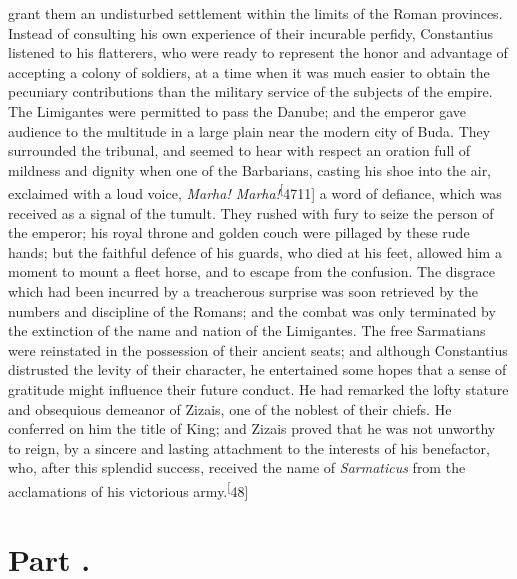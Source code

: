 grant them an undisturbed settlement within the limits of the
Roman provinces. Instead of consulting his own experience of
their incurable perfidy, Constantius listened to his flatterers,
who were ready to represent the honor and advantage of accepting
a colony of soldiers, at a time when it was much easier to obtain
the pecuniary contributions than the military service of the
subjects of the empire. The Limigantes were permitted to pass the
Danube; and the emperor gave audience to the multitude in a large
plain near the modern city of Buda. They surrounded the tribunal,
and seemed to hear with respect an oration full of mildness and
dignity when one of the Barbarians, casting his shoe into the
air, exclaimed with a loud voice, \textit{Marha! Marha!}\textsuperscript[4711] a word of
defiance, which was received as a signal of the tumult. They
rushed with fury to seize the person of the emperor; his royal
throne and golden couch were pillaged by these rude hands; but
the faithful defence of his guards, who died at his feet, allowed
him a moment to mount a fleet horse, and to escape from the
confusion. The disgrace which had been incurred by a treacherous
surprise was soon retrieved by the numbers and discipline of the
Romans; and the combat was only terminated by the extinction of
the name and nation of the Limigantes. The free Sarmatians were
reinstated in the possession of their ancient seats; and although
Constantius distrusted the levity of their character, he
entertained some hopes that a sense of gratitude might influence
their future conduct. He had remarked the lofty stature and
obsequious demeanor of Zizais, one of the noblest of their
chiefs. He conferred on him the title of King; and Zizais proved
that he was not unworthy to reign, by a sincere and lasting
attachment to the interests of his benefactor, who, after this
splendid success, received the name of \textit{Sarmaticus} from the
acclamations of his victorious army.\textsuperscript[48]




\section{Part \thesection.}

